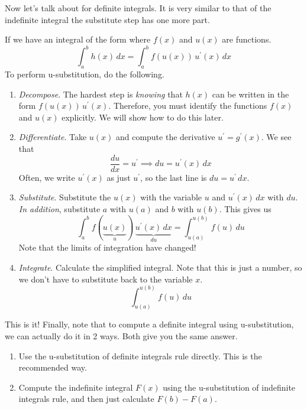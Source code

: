 \documentclass{article}
\begin{document}
  Now let's talk about for definite integrals. It is very similar to that of the indefinite integral the substitute step has one more part. 

  \begin{definition}
    If we have an integral of the form where $f(x)$ and $u(x)$ are functions. 
    \begin{equation}
      \int_a^b h(x) \,dx = \int_a^b f(u(x)) \, u^\prime(x) \,dx
    \end{equation} 
    To perform u-substitution, do the following. 
    \begin{enumerate}
      \item \textit{Decompose}. The hardest step is \textit{knowing} that $h(x)$ can be written in the form $f(u(x)) \, u^\prime (x)$. Therefore, you must identify the functions $f(x)$ and $u(x)$ explicitly. We will show how to do this later. 

      \item \textit{Differentiate}. Take $u(x)$ and compute the derivative $u^\prime = g^\prime (x)$. We see that 
      \begin{equation}
        \frac{du}{dx} = u^\prime \implies du = u^\prime (x) \,dx
      \end{equation} 
      Often, we write $u^\prime (x)$ as just $u^\prime$, so the last line is $du = u^\prime \,dx$. 

      \item \textit{Substitute}. Substitute the $u(x)$ with the variable $u$ and $u^\prime (x) \,dx$ with $du$. \textit{In addition}, substitute $a$ with $u(a)$ and $b$ with $u(b)$. This gives us 
      \begin{equation}
        \int_a^b f(\underbrace{u(x)}_{u}) \, \underbrace{u^\prime(x) \,dx}_{du} = \int_{u(a)}^{u(b)} f(u) \,du
      \end{equation} 
      Note that the limits of integration have changed!

      \item \textit{Integrate}. Calculate the simplified integral. Note that this is just a number, so we don't have to substitute back to the variable $x$. 
      \begin{equation}
        \int_{u(a)}^{u(b)} f(u) \,du
      \end{equation}
    \end{enumerate}
  \end{definition}

  This is it! Finally, note that to compute a definite integral using u-substitution, we can actually do it in 2 ways. Both give you the same answer.  
  \begin{enumerate}
    \item Use the u-substitution of definite integrals rule directly. This is the recommended way. 
    \item Compute the indefinite integral $F(x)$ using the u-substitution of indefinite integrals rule, and then just calculate $F(b) - F(a)$. 
  \end{enumerate}
\end{document}
